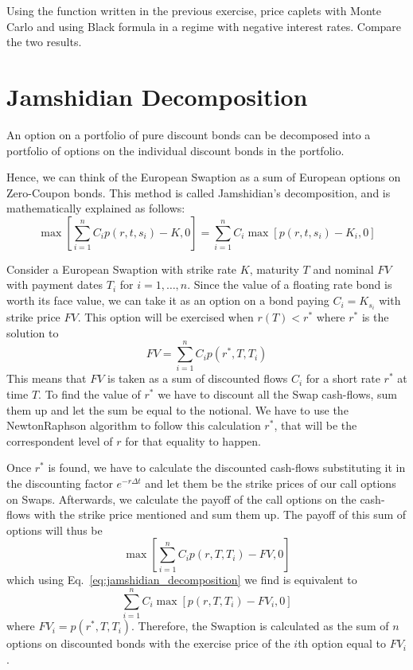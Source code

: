 \documentclass[12pt,a4paper]{article}
\begin{document}
\begin{question}
Using the function written in the previous exercise, price caplets with Monte Carlo and using Black formula in a regime with negative interest rates. Compare the two results.
\end{question}

\clearpage
\section{Jamshidian Decomposition}
An option on a portfolio of pure discount bonds can be decomposed into a portfolio of options on the individual discount bonds in the portfolio.

Hence, we can think of the European Swaption as a sum of European
options on Zero-Coupon bonds. This method is called Jamshidian’s decomposition, and is mathematically explained as follows:
\begin{equation}
	\max\left[\sum_{i=1}^n C_i p(r, t, s_i) - K, 0\right] = \sum_{i=1}^n C_i \max\left[p(r, t, s_i) - K_i, 0\right]
	\label{eq:jamshidian_decomposition}
\end{equation}

Consider a European Swaption with strike rate $K$, maturity $T$ and nominal $FV$
with payment dates $T_i$ for $i = 1,\ldots, n$. Since the value of a floating rate bond is worth its face value, we can take it as an option on a bond paying $C_i = K_{s_i}$ with strike price $FV$. This option will be exercised when $r(T) < r^*$ where $r^*$ is the solution to
\begin{equation}
	FV = \sum_{i=1}^n C_i p(r^*, T, T_i)
\end{equation}
This means that $FV$ is taken as a sum of discounted flows $C_i$ for a short rate $r^*$ at time $T$. To find the value of $r^*$ we have to discount all the Swap cash-flows, sum them up and let the sum be equal to the notional. We have to use the NewtonRaphson algorithm to follow this calculation $r^*$, that will be the correspondent level of $r$ for that equality to happen. 

Once $r^*$ is found, we have to calculate the discounted cash-flows substituting it in the discounting factor $e^{-r\Delta t}$ and let them be the strike prices of our call options on Swaps.
Afterwards, we calculate the payoff of the call options on the cash-flows with
the strike price mentioned and sum them up. The payoff of this sum of options
will thus be
\begin{equation}
	\max\left[\sum_{i=1}^n C_ip(r, T, T_i)-FV, 0\right]
\end{equation}
which using Eq.~\ref{eq:jamshidian_decomposition} we find is equivalent to
\begin{equation}
	\sum_{i=1}^n C_i \max\left[p(r, T, T_i)-FV_i, 0\right]
\end{equation}
where $FV_i = p(r^*, T, T_i)$. 
Therefore, the Swaption is calculated as the sum of $n$ options on discounted bonds with the exercise price of the $i$th option equal to $FV_i$.
\end{document}
